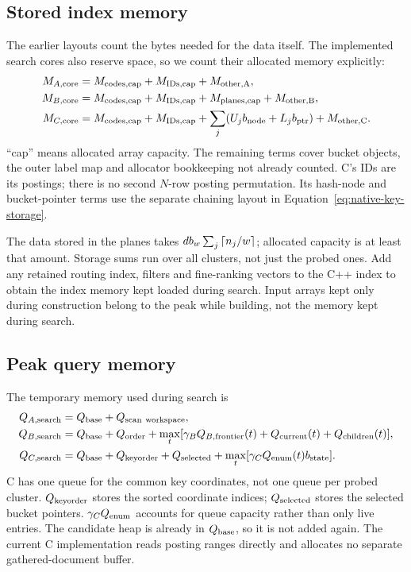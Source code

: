 \subsection{Stored index memory}
The earlier layouts count the bytes needed for the data itself. The implemented search cores
also reserve space, so we count their allocated memory explicitly:
\begin{align}
M_{A,\rm core}&=M_{\rm codes,cap}+M_{\rm IDs,cap}+M_{\rm other,A},\label{eq:final-storageA}\\
M_{B,\rm core}&=M_{\rm codes,cap}+M_{\rm IDs,cap}+M_{\rm planes,cap}
 +M_{\rm other,B},\label{eq:final-storageB}\\
M_{C,\rm core}&=M_{\rm codes,cap}+M_{\rm IDs,cap}
 +\sum_j(U_jb_{\rm node}+L_jb_{\rm ptr})+M_{\rm other,C}.
\label{eq:final-storageC}
\end{align}
``cap'' means allocated array capacity. The remaining terms cover bucket objects, the outer
label map and allocator bookkeeping not already counted. C's IDs are its postings; there is
no second $N$-row posting permutation. Its hash-node and bucket-pointer terms use the separate
chaining layout in Equation~\eqref{eq:native-key-storage}.

The data stored in the planes takes $d b_w\sum_j\left\lceil n_j/w\right\rceil$; allocated capacity is at least that amount.
Storage sums run over all clusters, not just the probed ones. Add any retained routing index,
filters and fine-ranking vectors to the C++ index to obtain the index memory kept loaded during search. Input arrays
kept only during construction belong to the peak while building, not the memory kept during search.

\subsection{Peak query memory}

The temporary memory used during search is
\begin{align}
Q_{A,\rm search}&=Q_{\mathrm{base}}+Q_{\rm scan\ workspace},\\
Q_{B,\rm search}&=Q_{\mathrm{base}}+Q_{\rm order}
 +\max_t[\gamma_B Q_{B,\rm frontier}(t)+Q_{\rm current}(t)+Q_{\rm children}(t)],\\
Q_{C,\rm search}&=Q_{\mathrm{base}}+Q_{\rm keyorder}+Q_{\rm selected}
 +\max_t[\gamma_C Q_{\rm enum}(t)b_{\rm state}].
\end{align}
C has one queue for the common key coordinates, not one queue per probed cluster.
$Q_{\rm keyorder}$ stores the sorted coordinate indices; $Q_{\rm selected}$ stores the selected
bucket pointers. $\gamma_C Q_{\rm enum}$ accounts for queue capacity rather than only live entries.
The candidate heap is already in $Q_{\mathrm{base}}$, so it is not added again. The current C implementation
reads posting ranges directly and allocates no separate gathered-document buffer.


